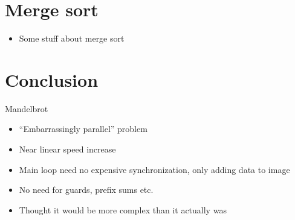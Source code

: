 \documentclass[presentation]{beamer}
\begin{document}
\section{Merge sort}

\begin{frame}
  \begin{itemize}
    \item Some stuff about merge sort
  \end{itemize}
\end{frame}

\section{Conclusion}

\begin{frame}{Mandelbrot}
  \begin{itemize}
    \item ``Embarrassingly parallel'' problem
    \item Near linear speed increase
    \item Main loop need no expensive synchronization, only adding data to image
    \item No need for guards, prefix sums etc.
    \item Thought it would be more complex than it actually was
  \end{itemize}
\end{frame}
\end{document}
